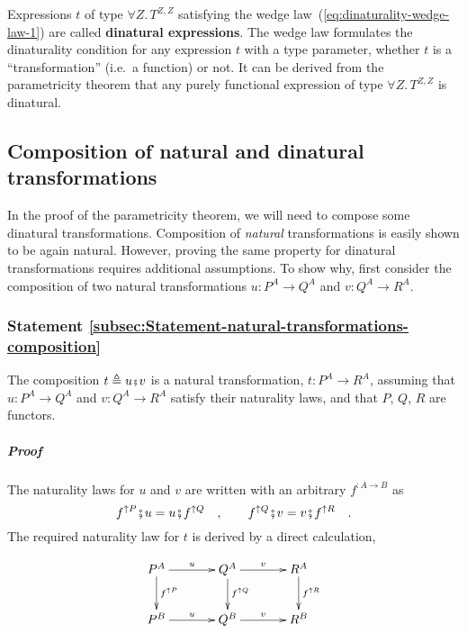 Expressions $t$ of type $\forall Z.\,T^{Z,Z}$ satisfying the wedge
law~(\ref{eq:dinaturality-wedge-law-1}) are called \textbf{dinatural
expressions}. The wedge law formulates
the dinaturality condition for any expression $t$ with a type parameter,
whether $t$ is a \textsf{``}transformation\textsf{''} (i.e.~a function) or not.
It can be derived from the parametricity theorem that any purely functional
expression of type $\forall Z.\,T^{Z,Z}$ is dinatural.

\subsection{Composition of natural and dinatural transformations}

In the proof of the parametricity theorem, we will need to compose
some dinatural transformations. Composition of \emph{natural} transformations
is easily shown to be again natural. However, proving the same property
for dinatural transformations requires additional assumptions. To
show why, first consider the composition of two natural transformations
$u:P^{A}\rightarrow Q^{A}$ and $v:Q^{A}\rightarrow R^{A}$.

\subsubsection{Statement \label{subsec:Statement-natural-transformations-composition}\ref{subsec:Statement-natural-transformations-composition}}

The composition $t\triangleq u\bef v$ is a natural transformation,
$t:P^{A}\rightarrow R^{A}$, assuming that $u:P^{A}\rightarrow Q^{A}$
and $v:Q^{A}\rightarrow R^{A}$ satisfy their naturality laws, and
that $P$, $Q$, $R$ are functors.

\subparagraph{Proof}

The naturality laws for $u$ and $v$ are written with an arbitrary
$f^{:A\rightarrow B}$ as
\[
f^{\uparrow P}\bef u=u\bef f^{\uparrow Q}\quad,\quad\quad f^{\uparrow Q}\bef v=v\bef f^{\uparrow R}\quad.
\]
The required naturality law for $t$ is derived by a direct calculation,

\begin{wrapfigure}[6]{l}{0.4\columnwidth}%
\vspace{-1.5\baselineskip}
\[
\xymatrix{\xyScaleY{2.0pc}\xyScaleX{3.0pc}P^{A}\ar[d]\sp(0.45){f^{\uparrow P}}\ar[r]\sp(0.5){u} & Q^{A}\ar[d]\sp(0.45){f^{\uparrow Q}}\ar[r]\sp(0.5){v} & R^{A}\ar[d]\sp(0.45){f^{\uparrow R}}\\
P^{B}\ar[r]\sp(0.5){u} & Q^{B}\ar[r]\sp(0.5){v} & R^{B}
}
\]

\vspace{-0\baselineskip}
\end{wrapfigure}%

